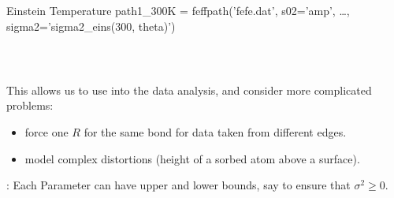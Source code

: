\begin{frame}[fragile]
\begin{cenpage}{135mm}
\begin{columns}[T]
\begin{column}{57mm}
\begin{CodeBlock}{55mm}{Einstein Temperature }
path1_300K = feffpath('fefe.dat', s02='amp', \ldots,
                      sigma2='sigma2_eins(300, theta)')

  \end{CodeBlock}\\
\end{column}
\end{columns}

\vmm This allows us to use {} into the data analysis, and
consider more complicated problems:
\vmm

  \begin{itemize}
  \item force one $R$ for the same bond for data taken from different
    edges.

  \item model complex distortions (height of a sorbed atom above a surface).
  \end{itemize}

  \vmm
  {}: Each Parameter can have upper and lower bounds, say to ensure that $\sigma^2 \ge 0$.

  \vfill
\end{cenpage}

\end{frame}










